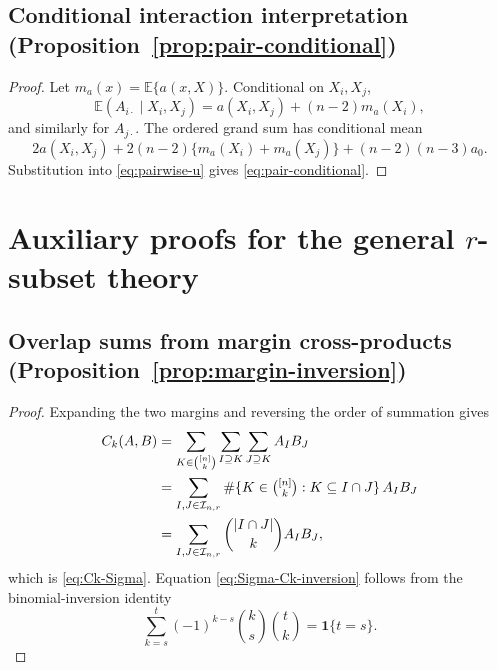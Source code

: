 \documentclass[11pt]{article}
\theoremstyle{plain}
\theoremstyle{definition}
\theoremstyle{remark}
\newcommand{\E}{\mathbb E}
\newcommand{\cI}{\mathcal I}
\begin{document}
\subsection{Conditional interaction interpretation
  (Proposition~\ref{prop:pair-conditional})}
\label{app:proof-pair-conditional}
\begin{proof}
Let $m_a(x)=\E\{a(x,X)\}$.  Conditional on $X_i,X_j$,
\[
 \E(A_{i\cdot}\mid X_i,X_j)
 =a(X_i,X_j)+(n-2)m_a(X_i),
\]
and similarly for $A_{j\cdot}$.  The ordered grand sum has conditional mean
\[
 2a(X_i,X_j)+2(n-2)\{m_a(X_i)+m_a(X_j)\}
 +(n-2)(n-3)a_0.
\]
Substitution into \eqref{eq:pairwise-u} gives
\eqref{eq:pair-conditional}.
\end{proof}


\section{\texorpdfstring{{Auxiliary proofs for the general $r$-subset theory}}{Auxiliary proofs for the general r-subset theory}}
\label{app:general-proofs}

\subsection{Overlap sums from margin cross-products
  (Proposition~\ref{prop:margin-inversion})}
\label{app:proof-margin-inversion}
\begin{proof}
Expanding the two margins and reversing the order of summation gives
\begin{align*}
 C_k(A,B)
 &=\sum_{K\in\binom{[n]}k}
   \sum_{I\supseteq K}\sum_{J\supseteq K}A_I B_J\\
 &=\sum_{I,J\in\cI_{n,r}}
   \#\{K\in\tbinom{[n]}k:K\subseteq I\cap J\}\,A_I B_J\\
 &=\sum_{I,J\in\cI_{n,r}}\binom{|I\cap J|}{k}A_I B_J,
\end{align*}
which is \eqref{eq:Ck-Sigma}.  Equation
\eqref{eq:Sigma-Ck-inversion} follows from the binomial-inversion identity
\[
 \sum_{k=s}^t(-1)^{k-s}\binom{k}{s}\binom{t}{k}
 =\mathbf 1\{t=s\}.
\]
\end{proof}
\end{document}

